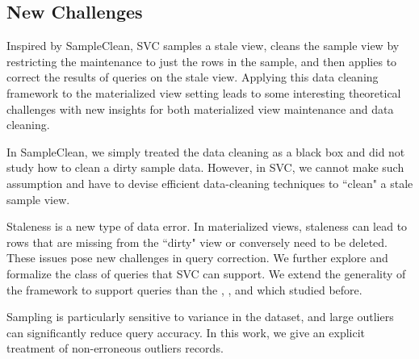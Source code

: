 \subsection{New Challenges}
Inspired by SampleClean, SVC samples a stale view, cleans the sample view by restricting the maintenance to just the rows in the sample, and then applies \nsc to correct the results of queries on the stale view.
Applying this data cleaning framework to the materialized view setting leads to some interesting theoretical challenges with new insights for both materialized view maintenance and data cleaning.

In SampleClean, we simply treated the data cleaning as a black box and did not study how to clean a dirty sample data. However, in SVC, we cannot make such assumption and have to devise efficient data-cleaning techniques to ``clean" a stale sample view. 


Staleness is a new type of data error.
In materialized views, staleness can lead to rows that are missing from the ``dirty" view or conversely need to be deleted. These issues pose new challenges in  query correction. 
We further explore and formalize the class of queries that SVC can support.
We extend the generality of the framework to support queries than the \sumfunc, \avgfunc, and \countfunc which studied before.


Sampling is particularly sensitive to variance in the dataset, and large outliers can significantly reduce query accuracy.
In this work, we give an explicit treatment of non-erroneous outliers records. 




